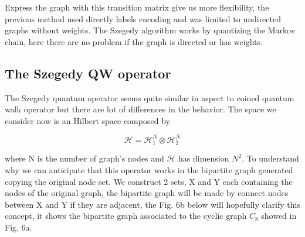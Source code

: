Express the graph with this transition matrix give us more flexibility, the previous 
method used directly labels encoding and was limited to undirected graphs without weights. The Szegedy algorithm works by quantizing the Markov chain, here there are no problem if the graph is directed
or has weights. 

\subsection{The Szegedy QW operator}
The Szegedy quantum operator seems quite similar in aspect to coined quantum walk operator but there are lot of differences in the behavior. 
The space we consider now is an Hilbert space composed by 

\begin{equation}
    \mathcal{H} = \mathcal{H}_{1}^{N} \otimes \mathcal{H}_{2}^{N}
\end{equation}

where N is the number of graph's nodes and $\mathcal{H}$ has dimension $N^2$. To understand why we can anticipate that this operator works in the bipartite graph generated copying the original node set. 
We construct 2 sets, X and Y each containing the nodes of the original graph, the bipartite graph will be 
made by connect nodes between X and Y if they are adjacent, the Fig. 6b below will hopefully clarify this concept, it shows the bipartite graph associated
to the cyclic graph $C_{8}$ showed in Fig. 6a.


